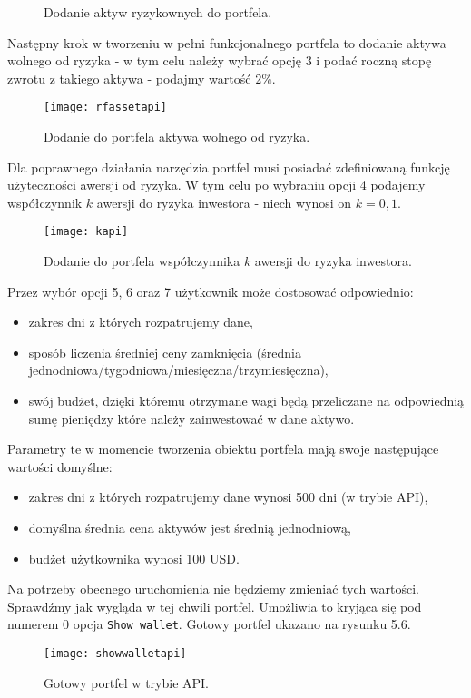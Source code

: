 \documentclass[magister]{dyplom}
\def\code#1{\texttt{#1}}
\begin{document}
\begin{figure}[hb]
	\centering
	\quad
	\caption{Dodanie aktyw ryzykownych do portfela.}
\end{figure}

Następny krok w tworzeniu w pełni funkcjonalnego portfela to dodanie aktywa wolnego od ryzyka - w tym celu należy wybrać opcję 3 i podać roczną stopę zwrotu z takiego aktywa - podajmy wartość $2\%$.
\newpage
\begin{figure}[ht]
	\centering
	\texttt{[image: rfassetapi]}
	\caption{Dodanie do portfela aktywa wolnego od ryzyka.}
\end{figure}

Dla poprawnego działania narzędzia portfel musi posiadać zdefiniowaną funkcję użyteczności awersji od ryzyka. W tym celu po wybraniu opcji 4 podajemy współczynnik $k$ awersji do ryzyka inwestora - niech wynosi on $k=0,1$.

\begin{figure}[ht]
	\centering
	\texttt{[image: kapi]}
	\caption{Dodanie do portfela współczynnika $k$ awersji do ryzyka inwestora.}
\end{figure}

Przez wybór opcji 5, 6 oraz 7 użytkownik może dostosować odpowiednio:
\begin{itemize}
	\item zakres dni z których rozpatrujemy dane,
	\item sposób liczenia średniej ceny zamknięcia (średnia jednodniowa/tygodniowa/miesięczna/trzymiesięczna),
	\item swój budżet, dzięki któremu otrzymane wagi będą przeliczane na odpowiednią sumę pieniędzy które należy zainwestować w dane aktywo.
\end{itemize}
Parametry te w momencie tworzenia obiektu portfela mają swoje następujące wartości domyślne:
\begin{itemize}
	\item zakres dni z których rozpatrujemy dane wynosi 500 dni (w trybie API),
	\item domyślna średnia cena aktywów jest średnią jednodniową,
	\item budżet użytkownika wynosi 100 USD.
\end{itemize}
Na potrzeby obecnego uruchomienia nie będziemy zmieniać tych wartości. Sprawdźmy jak wygląda w tej chwili portfel. Umożliwia to kryjąca się pod numerem 0 opcja \code{Show wallet}. Gotowy portfel ukazano na rysunku 5.6.
\newpage
\begin{figure}[ht]
	\centering
	\texttt{[image: showwalletapi]}
	\caption{Gotowy portfel w trybie API.}
\end{figure}
\end{document}
